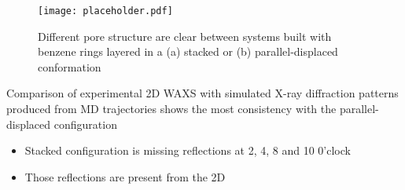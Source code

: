 \documentclass{article}
\begin{document}
\begin{itemize}
	\begin{figure}
	\centering
	\texttt{[image: placeholder.pdf]}
		\caption{Different pore structure are clear between systems built with benzene rings layered in a (a) stacked or (b) parallel-displaced conformation}
		\label{fig:porestructures}
	\end{figure}

	Comparison of experimental 2D WAXS with simulated X-ray diffraction patterns produced from MD trajectories shows the most consistency with the parallel-displaced configuration
	\begin{itemize} 
		\item Stacked configuration is missing reflections at 2, 4, 8 and 10 0'clock
		\item Those reflections are present from the 2D 

 

\end{itemize}
\end{itemize}
\end{document}

